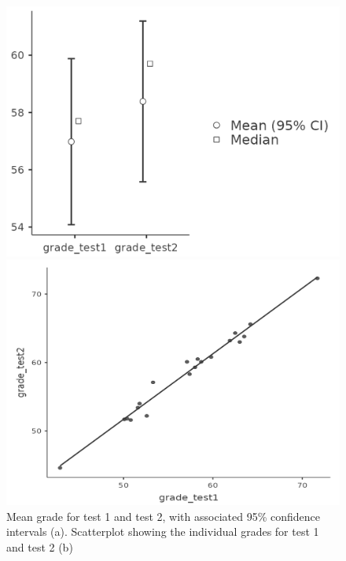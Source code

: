 \documentclass[
  a4paper,
]{book}
\begin{document}
\begin{figure}

\begin{minipage}[b]{0.50\linewidth}

{\centering 

\includegraphics{images/fig11-13a.png}

}

\subcaption{\label{fig-fig11-13a}}
\end{minipage}%
%
\begin{minipage}[b]{0.50\linewidth}

{\centering 

\includegraphics{images/fig11-13b.png}

}

\subcaption{\label{fig-fig11-13b}}
\end{minipage}%

\caption{\label{fig-fig11-13}Mean grade for test 1 and test 2, with
associated 95\% confidence intervals (a). Scatterplot showing the
individual grades for test 1 and test 2 (b)}

\end{figure}
\end{document}
